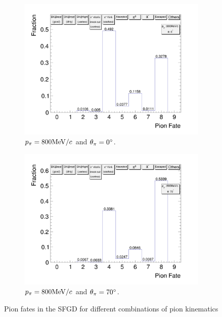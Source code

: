 \begin{figure}[t]
\begin{subfigure}{\dbfigwid\textwidth}
                    \label{subfig:pi-fate-300-70}
               \end{subfigure}
              \\
               \begin{subfigure}{\dbfigwid\textwidth}
                    \includegraphics[width=\textwidth]{figures/sel/pion_fate_800_0.png}
                    \caption{$p_{\pi}=800\textrm{MeV}/c$ and $\theta_{\pi}=0^\circ$.}
                    \label{subfig:pi-fate-800-0}
               \end{subfigure}
               \begin{subfigure}{\dbfigwid\textwidth}
                    \includegraphics[width=\textwidth]{figures/sel/pion_fate_800_70.png}
                    \caption{$p_{\pi}=800\textrm{MeV}/c$ and $\theta_{\pi}=70^\circ$.}
                    \label{subfig:pi-fate-800-70}
               \end{subfigure}
               \caption{Pion fates in the SFGD for different combinations of pion kinematics}
               \label{fig:pi-fate}
            \end{figure}
       
